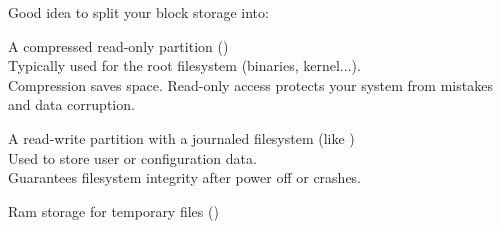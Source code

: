     Good idea to split your block storage into:
    \startitemize
    \item A compressed read-only partition ()\\
      Typically used for the root filesystem (binaries, kernel...).\\
      Compression saves space. Read-only access protects your system
      from mistakes and data corruption.
    \item A read-write partition with a journaled filesystem (like )\\
      Used to store user or configuration data.\\
      Guarantees filesystem integrity after power off or crashes.
    \item Ram storage for temporary files ()
    \stopitemize



